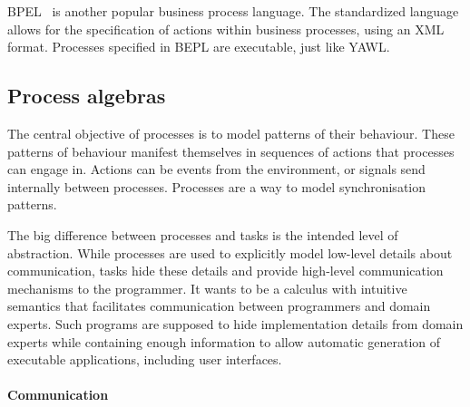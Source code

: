 BPEL~\cite{bpel} is another popular business process language. The standardized
language allows for the specification of actions within business processes,
using an XML format. Processes specified in BEPL are executable, just like YAWL.



\subsection{Process algebras}

The central objective of processes is to model patterns of their behaviour.
These patterns of behaviour manifest themselves in sequences of actions that processes can engage in.
Actions can be events from the environment, or signals send internally between processes.
Processes are a way to model synchronisation patterns.



%
The big difference between processes and tasks is the intended level of abstraction.
While processes are used to explicitly model low-level details about communication, tasks hide these details and provide high-level communication mechanisms to the programmer.
It wants to be a calculus with intuitive semantics that facilitates communication between programmers and domain experts.
Such programs are supposed to hide implementation details from domain experts while containing enough information to allow automatic generation of executable applications, including user interfaces.



\paragraph{Communication}

